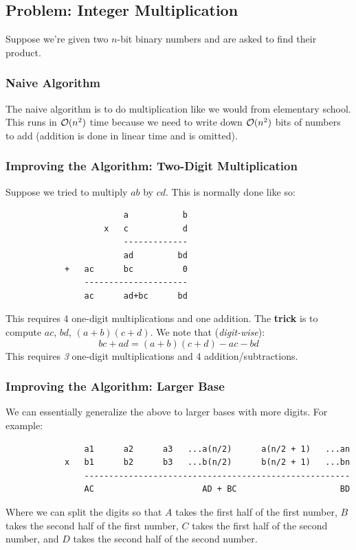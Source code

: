 \documentclass[letterpaper]{article}
\begin{document}
\subsection{Problem: Integer Multiplication}
Suppose we're given two $n$-bit binary numbers and are asked to find their product. 

\subsubsection{Naive Algorithm}
The naive algorithm is to do multiplication like we would from elementary school. This runs in $\mathcal{O}(n^2)$ time because we need to write down $\mathcal{O}(n^2)$ bits of numbers to add (addition is done in linear time and is omitted).

\subsubsection{Improving the Algorithm: Two-Digit Multiplication}
Suppose we tried to multiply $ab$ by $cd$. This is normally done like so: 
\begin{verbatim}
                        a           b
                    x   c           d
                        -------------
                        ad         bd 
            +   ac      bc          0
                ---------------------
                ac      ad+bc      bd 
\end{verbatim}
This requires 4 one-digit multiplications and one addition. The \textbf{trick} is to compute $ac$, $bd$, $(a + b)(c + d)$. We note that (\emph{digit-wise}): 
\[bc + ad = (a + b)(c + d) - ac - bd\]
This requires \emph{3} one-digit multiplications and 4 addition/subtractions.

\subsubsection{Improving the Algorithm: Larger Base}
We can essentially generalize the above to larger bases with more digits. For example:
\begin{verbatim}
                a1      a2      a3   ...a(n/2)      a(n/2 + 1)   ...an
            x   b1      b2      b3   ...b(n/2)      b(n/2 + 1)   ...bn
                ------------------------------------------------------
                AC                      AD + BC                     BD 
\end{verbatim}
Where we can split the digits so that $A$ takes the first half of the first number, $B$ takes the second half of the first number, $C$ takes the first half of the second number, and $D$ takes the second half of the second number. 
\end{document}
